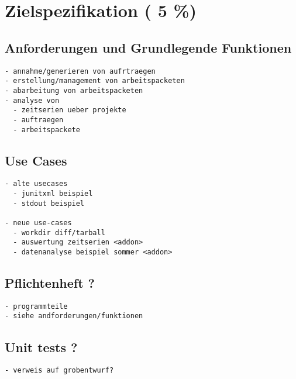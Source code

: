 \chapter{Zielspezifikation ( 5 \%)}





\section{Anforderungen und Grundlegende Funktionen}

\begin{verbatim}
- annahme/generieren von aufrtraegen
- erstellung/management von arbeitspacketen
- abarbeitung von arbeitspacketen
- analyse von
  - zeitserien ueber projekte
  - auftraegen
  - arbeitspackete
\end{verbatim}

\section{Use Cases}

\begin{verbatim}
- alte usecases
  - junitxml beispiel
  - stdout beispiel

- neue use-cases
  - workdir diff/tarball
  - auswertung zeitserien <addon>
  - datenanalyse beispiel sommer <addon>
\end{verbatim}

\section{Pflichtenheft ?}

\begin{verbatim}
- programmteile
- siehe andforderungen/funktionen

\end{verbatim}

\section{Unit tests ?}


\begin{verbatim}
- verweis auf grobentwurf?

\end{verbatim}

